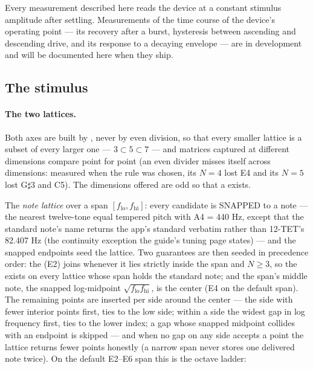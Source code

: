 \documentclass[11pt,a4paper]{article}
\begin{document}
Every measurement described here reads the device at a
constant stimulus amplitude after settling. Measurements of the time
course of the device's operating point --- its recovery after a burst,
hysteresis between ascending and descending drive, and its response to a
decaying envelope --- are in development and will be documented here when
they ship.

\subsection{The stimulus}
\label{sec:matrix-stimulus}
\paragraph{The two lattices.} Both axes are built by ,
never by even division, so that every smaller lattice is a subset of
every larger one --- $3 \subset 5 \subset 7$ --- and matrices captured at
different dimensions compare point for point (an even divider misses
itself across dimensions: measured when the rule was chosen, its $N=4$
lost E4 and its $N=5$ lost G$\sharp$3 and C5). The dimensions offered are
odd so that a  exists.

The \emph{note lattice} over a span $[f_{\mathrm{lo}}, f_{\mathrm{hi}}]$:
every candidate is SNAPPED to a note --- the nearest twelve-tone equal
tempered pitch with A4 = 440 Hz, except that the standard note's name
returns the app's standard \mlatNoteAnchor{} verbatim rather than
12-TET's 82.407 Hz (the continuity exception the guide's tuning page
states) --- and the snapped endpoints seed the lattice. Two guarantees
are then seeded in precedence order: the  (E2) joins
whenever it lies strictly inside the span and $N \ge 3$, so the
 exists on every lattice whose span holds the
standard note; and the span's middle note, the snapped log-midpoint
$\sqrt{f_{\mathrm{lo}} f_{\mathrm{hi}}}$, is the center (E4 on the
default span). The remaining points are inserted per side around the
center --- the side with fewer interior points first, ties to the low
side; within a side the widest gap in log frequency first, ties to the
lower index; a gap whose snapped midpoint collides with an endpoint is
skipped --- and when no gap on any side accepts a point the lattice
returns fewer points honestly (a narrow span never stores one delivered
note twice). On the default E2--E6 span this is the octave ladder:
\begin{center}\small\mlatNoteTable\end{center}
\end{document}
